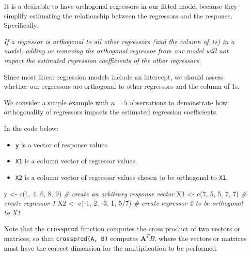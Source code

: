 \documentclass[
]{book}
\newenvironment{Shaded}{\begin{snugshade}}{\end{snugshade}}
\newcommand{\CommentTok}[1]{\textcolor[rgb]{0.56,0.35,0.01}{\textit{#1}}}
\newcommand{\DecValTok}[1]{\textcolor[rgb]{0.00,0.00,0.81}{#1}}
\newcommand{\FunctionTok}[1]{\textcolor[rgb]{0.00,0.00,0.00}{#1}}
\newcommand{\NormalTok}[1]{#1}
\newcommand{\OtherTok}[1]{\textcolor[rgb]{0.56,0.35,0.01}{#1}}
\newcommand{\SpecialCharTok}[1]{\textcolor[rgb]{0.00,0.00,0.00}{#1}}
\providecommand{\tightlist}{%
  \setlength{\itemsep}{0pt}\setlength{\parskip}{0pt}}
\theoremstyle{definition}
\theoremstyle{definition}
\theoremstyle{definition}
\theoremstyle{definition}
\theoremstyle{remark}
\begin{document}
It is a desirable to have orthogonal regressors in our fitted model
because they simplify estimating the relationship between the regressors
and the response. Specifically:

\emph{If a regressor is orthogonal to all other regressors (and the column of
1s) in a model, adding or removing the orthogonal regressor from our
model will not impact the estimated regression coefficients of the other
regressors.}

Since most linear regression models include an intercept, we should
assess whether our regressors are orthogonal to other regressors and the
column of 1s.

We consider a simple example with \(n=5\) observations to demonstrate how orthogonality of regressors impacts the estimated regression coefficients.

In the code below:

\begin{itemize}
\tightlist
\item
  \texttt{y} is a vector of response values.
\item
  \texttt{X1} is a column vector of regressor values.
\item
  \texttt{X2} is a column vector of regressor values chosen to be orthogonal to \texttt{X1}.
\end{itemize}

\begin{Shaded}
\begin{Highlighting}[]
\NormalTok{y }\OtherTok{\textless{}{-}} \FunctionTok{c}\NormalTok{(}\DecValTok{1}\NormalTok{, }\DecValTok{4}\NormalTok{, }\DecValTok{6}\NormalTok{, }\DecValTok{8}\NormalTok{, }\DecValTok{9}\NormalTok{)       }\CommentTok{\# create an arbitrary response vector}
\NormalTok{X1 }\OtherTok{\textless{}{-}} \FunctionTok{c}\NormalTok{(}\DecValTok{7}\NormalTok{, }\DecValTok{5}\NormalTok{, }\DecValTok{5}\NormalTok{, }\DecValTok{7}\NormalTok{, }\DecValTok{7}\NormalTok{)      }\CommentTok{\# create regressor 1}
\NormalTok{X2 }\OtherTok{\textless{}{-}} \FunctionTok{c}\NormalTok{(}\SpecialCharTok{{-}}\DecValTok{1}\NormalTok{, }\DecValTok{2}\NormalTok{, }\SpecialCharTok{{-}}\DecValTok{3}\NormalTok{, }\DecValTok{1}\NormalTok{, }\DecValTok{5}\SpecialCharTok{/}\DecValTok{7}\NormalTok{)  }\CommentTok{\# create regressor 2 to be orthogonal to X1}
\end{Highlighting}
\end{Shaded}

Note that the \texttt{crossprod} function computes the cross product of two vectors or matrices, so that \texttt{crossprod(A,\ B)} computes \(\mathbf{A}^T B\), where the vectors or matrices must have the correct dimension for the multiplication to be performed.
\end{document}
